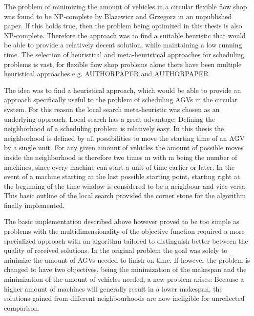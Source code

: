 The problem of minimizing the amount of vehicles in a circular flexible flow shop was found to be NP-complete by Blazewicz and Grzegorz in an unpublished paper. If this
holds true, then the problem being optimized in this thesis is also NP-complete. Therefore the approach was to find a suitable heuristic that would be able to provide a relatively decent
solution, while maintaining a low running time. The selection of heuristical and meta-heuristical approaches for scheduling problems is vast, for
flexible flow shop problems alone there have been multiple heuristical approaches e.g. AUTHORPAPER and AUTHORPAPER

The idea was to find a heuristical approach, which would be able to provide an approach specifically useful to the problem of scheduling AGVs in the circular system. For this reason
the local search meta-heuristic was chosen as an underlying approach. Local search has a great advantage: Defining the neighborhood of
a scheduling problem is relatively easy. In this thesis the neighborhood is defined by all possibilities to move the starting time of an AGV by
a single unit. For any given amount of vehicles the amount of possible moves inside the neighborhood is therefore two times m with m being the number of machines, since every machine
can start a unit of time earlier or later. In the event of a machine starting at the last possible starting point, starting right at the beginning
of the time window is considered to be a neighbour and vice versa. This basic outline of the local search provided the corner stone for the algorithm
finally implemented. 

The basic implementation described above however proved to be too simple as problems with the multidimensionality of the objective function required a more specialized approach with an algorithm
tailored to distinguish better between the quality of received solutions. In the original problem the goal was solely to minimize the amount of AGVs needed to finish on time. If however the problem is changed to
have two objectives, being the minimization of the makespan and the minimization of the amount of vehicles needed, a new problem arises: 
Because a higher amount of machines will generally result in a lower makespan, the solutions gained from different neighbourhoods are now ineligible for unreflected comparison.

